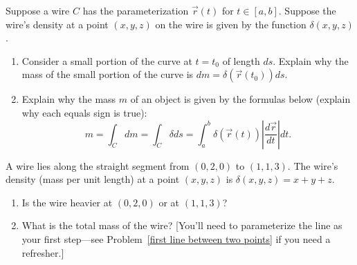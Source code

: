 \begin{problem}[Mass]\label{mass of curve}%
%
 Suppose a wire $C$ has the parameterization $\vec r(t)$ for $t\in[a,b]$.  Suppose the wire's density at a point $(x,y,z)$ on the wire is given by the function $\delta(x,y,z)$. 
 \begin{enumerate}
  \item Consider a small portion of the curve at $t=t_0$ of length $ds$.  Explain why the mass of the small portion of the curve is $dm=\delta(\vec r(t_0)) ds$.
  \item Explain why the mass $m$ of an object is given by the formulas below (explain why each equals sign is true):
$$m=\int_C dm = \int_C \delta ds = \int_a^b \delta(\vec r(t)) \left|\frac{d\vec r}{dt}\right|dt.$$
 \end{enumerate}
\end{problem}

\begin{problem}%
%
 A wire lies along the straight segment from $(0,2,0)$ to $(1,1,3)$.  The wire's density (mass per unit length) at a point $(x,y,z)$ is $\delta(x,y,z)=x+y+z$. 
 \begin{enumerate}
 \item Is the wire heavier at $(0,2,0)$ or at $(1,1,3)$?
 \item  What is the total mass of the wire?  [You'll need to parameterize the line as your first step---see Problem~\ref{first line between two points} if you need a refresher.]
 \end{enumerate}
\end{problem}



